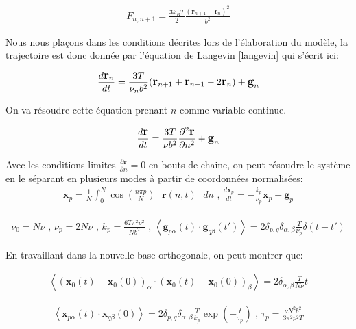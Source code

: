 \documentclass[a4paper,11pt]{article}
\begin{document}
\begin{eqnarray}
F_{n,n+1} = \frac{3 k_B T}{2} \frac{(\textbf{r}_{n+1}-\textbf{r}_n)^2}{b^2}
\end{eqnarray}

Nous nous plaçons dans les conditions décrites lors de l'élaboration du modèle, la trajectoire est donc donnée par l'équation de Langevin \ref{langevin} qui s'écrit ici:

\begin{eqnarray}
\large{
\frac{d \textbf{r}_n}{dt} =  \frac{3T}{\nu_n b^2}( \textbf{r}_{n+1} +\textbf{r}_{n-1} -2\textbf{r}_n )  + \textbf{g}_n}
\end{eqnarray}

On va résoudre cette équation prenant $n$ comme variable continue.

\begin{eqnarray}
\large{
\frac{d \textbf{r}}{dt} =  \frac{3T}{\nu b^2}\frac{\partial ^2 \textbf{r}}{\partial  n^2} + \textbf{g}_n}
\end{eqnarray}

Avec les conditions limites $\frac{\partial  \textbf{r}}{\partial  n}=0$ en bouts de chaine, on peut résoudre le système en le séparant en plusieurs modes à  partir de coordonnées normalisées: 
\begin{eqnarray}
\textbf{x}_p= \frac{1}{N} \int_0^N \cos \left(\frac{n\pi p}{N}\right) \text{ }\textbf{r}(n,t)\text{ } dn \text{ , } \frac{d \textbf{x}_p}{dt} =  -\frac{k_p}{\nu _p} \textbf{x}_p + \textbf{g}_p
\end{eqnarray}



\begin{eqnarray}
\nu_0=  N \nu \text{ , } \nu_p= 2 N \nu  \text{ , }  k_p=\frac{6T\pi^2 p^2}{N b^2}  \text{ , }  \left<\textbf{g}_{p\alpha}(t) \cdot \textbf{g}_{q\beta}(t')\right> = 2\delta_{p,q} \delta_{\alpha ,\beta} \frac{T}{\nu_p} \delta(t-t')
\end{eqnarray}

En travaillant dans la nouvelle base orthogonale, on peut montrer que:


\begin{eqnarray}
\left<(\textbf{x}_{0}(t)-\textbf{x}_{0}(0))_\alpha \cdot (\textbf{x}_{0}(t)-\textbf{x}_{0}(0))_\beta \right> = 2 \delta_{\alpha ,\beta} \frac{T}{N\nu}t
\end{eqnarray}

\begin{eqnarray}
\left<\textbf{x}_{p\alpha}(t) \cdot \textbf{x}_{q\beta}(0)\right> = 2\delta_{p,q} \delta_{\alpha ,\beta} \frac{T}{k_p} \exp\left(-\frac{t}{\tau_p}\right) \text{ , } \tau _p = \frac{\nu N^2 b^2}{3\pi^2p^2T}
\end{eqnarray}
\end{document}
